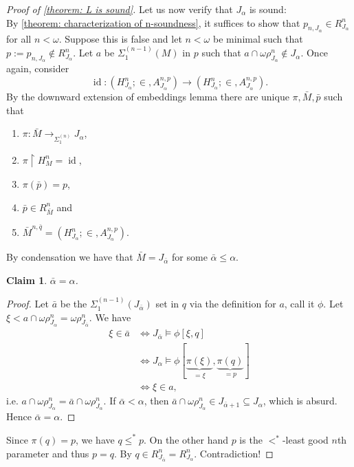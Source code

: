 \documentclass[12pt,a4paper]{article}
\theoremstyle{nicestyle}
\newtheorem{claim}{Claim}[subsection]
\newenvironment{proofblack}{\begin{proof}}
  {\renewcommand{\qedsymbol}{$\blacksquare$}\end{proof}}
\DeclareMathOperator{\id}{id}
\begin{document}
\begin{proof}[Proof of \autoref{theorem: L is sound}]
      Let us now verify that $J_{\alpha}$ is sound: \\

      By \autoref{theorem: characterization of n-soundness}, it
      suffices to show that $p_{n, J_{\alpha}} \in R^{n}_{J_{\alpha}}$
      for all $n < \omega$. Suppose this is false and let $n < \omega$
      be minimal such that
      $p :=p_{n,J_{\alpha}} \not \in R^{n}_{J_{\alpha}}$. Let $a$ be
      $\Sigma^{(n-1)}_{1}(M)$ in $p$ such that
      $a \cap \omega\rho^{n}_{J_{\alpha}} \not \in J_{\alpha}$. Once
      again, consider
      \[
	\id \colon (H^{n}_{J_{\alpha}}; \in, A^{n, p}_{J_{\alpha}}) \to
        (H^{n}_{J_{\alpha}}; \in, A^{n, p}_{J_{\alpha}}).
      \]
      By the downward extension of embeddings lemma there are unique
      $\pi, \bar{M}, \bar{p}$ such that
      \begin{enumerate}
      \item $\pi \colon \bar{M} \to_{\Sigma^{(n)}_{1}} J_{\alpha}$,
      \item $\pi \restriction H^{n}_{M} = \id$,
      \item $\pi(\bar{p}) = p$,
      \item $\bar{p} \in R^{n}_{\bar{M}}$ and
      \item
        $\bar{M}^{n, \bar{q}} = (H^{n}_{J_{\alpha}}; \in, A^{n,
          p}_{J_{\alpha}})$.
      \end{enumerate}
      By condensation we have that $\bar{M} = J_{\bar{\alpha}}$ for
      some $\bar{\alpha} \leq \alpha$.

      \begin{claim}
        $\bar{\alpha} = \alpha$.
      \end{claim}

      \begin{proofblack}
        Let $\bar{a}$ be the $\Sigma^{(n-1)}_{1}(J_{\bar{\alpha}})$
        set in $q$ via the definition for $a$, call it $\phi$. Let
        $\xi < a \cap \omega\rho^{n}_{J_{\alpha}} =
        \omega\rho^{n}_{J_{\bar{\alpha}}}$. We have
        \begin{align*}
          \xi \in \bar{a} & \iff J_{\bar{\alpha}} \models \phi[\xi, q] \\
                          & \iff J_{\alpha} \models \phi[\underbrace{\pi(\xi)}_{= \xi}, \underbrace{\pi(q)}_{= p}] \\
                          & \iff \xi \in a,
        \end{align*}
        i.e.
        $a \cap \omega\rho^{n}_{J_{\alpha}} = \bar{a} \cap
        \omega\rho^{n}_{J_{\alpha}}$. If $\bar{\alpha} < \alpha$, then
        $\bar{a} \cap \omega\rho^{n}_{J_{\alpha}} \in
        J_{\bar{\alpha}+1} \subseteq J_{\alpha}$, which is
        absurd. Hence $\bar{\alpha} = \alpha$.
      \end{proofblack}

      Since $\pi(q) = p$, we have $q \le^{*} p$. On the other hand $p$
      is the $<^{*}$-least good $n$th parameter and thus $p = q$. By
      $q \in R^{n}_{J_{\bar{\alpha}}} =
      R^{n}_{J_{\alpha}}$. Contradiction!
  \end{proof}
\end{document}
